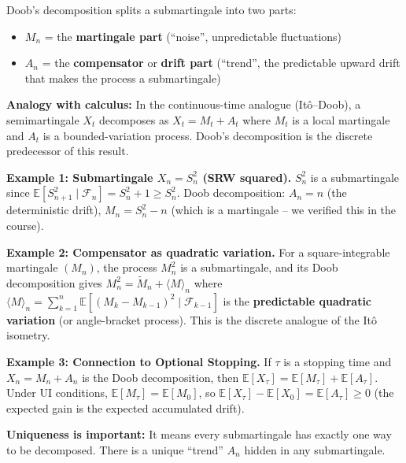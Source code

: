 \documentclass[12pt]{article}
\newcommand{\E}{\mathbb{E}}
\newcommand{\F}{\mathcal{F}}
\newcommand{\1}{\mathbf{1}}
\begin{document}
\begin{tcolorbox}[bluebox={Intuition: Separating the ``Trend'' from the ``Noise''}]
Doob's decomposition splits a submartingale into two parts:
\begin{itemize}
  \item $M_n$ = the \textbf{martingale part} (``noise'', unpredictable fluctuations)
  \item $A_n$ = the \textbf{compensator} or \textbf{drift part} (``trend'', the
        predictable upward drift that makes the process a submartingale)
\end{itemize}

\medskip
\textbf{Analogy with calculus:} In the continuous-time analogue (It\^o--Doob),
a semimartingale $X_t$ decomposes as $X_t = M_t + A_t$ where $M_t$ is a local
martingale and $A_t$ is a bounded-variation process.  Doob's decomposition is the
discrete predecessor of this result.

\medskip
\textbf{Example 1: Submartingale $X_n = S_n^2$ (SRW squared).}
$S_n^2$ is a submartingale since $\E[S_{n+1}^2 \mid \F_n] = S_n^2 + 1 \ge S_n^2$.
Doob decomposition: $A_n = n$ (the deterministic drift), $M_n = S_n^2 - n$ (which is
a martingale -- we verified this in the course).

\medskip
\textbf{Example 2: Compensator as quadratic variation.}
For a square-integrable martingale $(M_n)$, the process $M_n^2$ is a submartingale,
and its Doob decomposition gives $M_n^2 = \widetilde{M}_n + \langle M \rangle_n$
where $\langle M \rangle_n = \sum_{k=1}^n \E[(M_k - M_{k-1})^2 \mid \F_{k-1}]$
is the \textbf{predictable quadratic variation} (or angle-bracket process).
This is the discrete analogue of the It\^o isometry.

\medskip
\textbf{Example 3: Connection to Optional Stopping.}
If $\tau$ is a stopping time and $X_n = M_n + A_n$ is the Doob decomposition, then
$\E[X_\tau] = \E[M_\tau] + \E[A_\tau]$.  Under UI conditions, $\E[M_\tau] = \E[M_0]$,
so $\E[X_\tau] - \E[X_0] = \E[A_\tau] \ge 0$ (the expected gain is the expected
accumulated drift).

\medskip
\textbf{Uniqueness is important:}  It means every submartingale has exactly one way
to be decomposed.  There is a unique ``trend'' $A_n$ hidden in any submartingale.
\end{tcolorbox}
\end{document}
